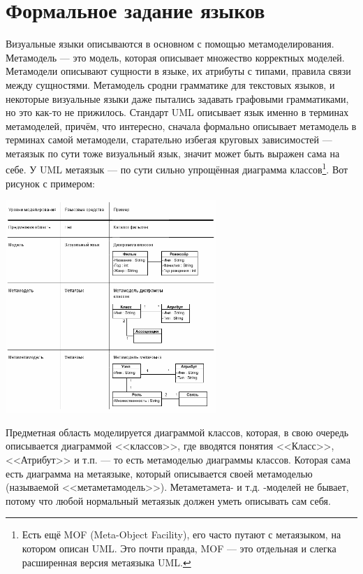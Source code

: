\documentclass{text-style}
\begin{document}

\section{Формальное задание языков}

Визуальные языки описываются в основном с помощью метамоделирования. Метамодель --- это модель, которая описывает множество корректных моделей. Метамодели описывают сущности в языке, их атрибуты с типами, правила связи между сущностями. Метамодель сродни грамматике для текстовых языков, и некоторые визуальные языки даже пытались задавать графовыми грамматиками, но это как-то не прижилось. Стандарт UML описывает язык именно в терминах метамоделей, причём, что интересно, сначала формально описывает метамодель в терминах самой метамодели, старательно избегая круговых зависимостей --- метаязык по сути тоже визуальный язык, значит может быть выражен сама на себе. У UML метаязык --- по сути сильно упрощённая диаграмма классов\footnote{Есть ещё MOF (Meta-Object Facility), его часто путают с метаязыком, на котором описан UML. Это почти правда, MOF --- это отдельная и слегка расширенная версия метаязыка UML.}. Вот рисунок с примером:


\begin{center}
    \includegraphics[width=0.6\textwidth]{metalevels-ru.png}
\end{center}

Предметная область моделируется диаграммой классов, которая, в свою очередь описывается диаграммой <<классов>>, где вводятся понятия <<Класс>>, <<Атрибут>> и т.п. --- то есть метамоделью диаграммы классов. Которая сама есть диаграмма на метаязыке, который описывается своей метамоделью (называемой <<метаметамодель>>). Метаметамета- и т.д. -моделей не бывает, потому что любой нормальный метаязык должен уметь описывать сам себя.
\end{document}
